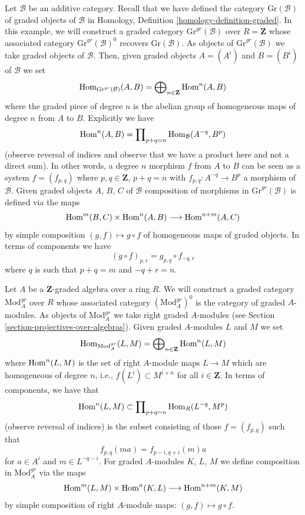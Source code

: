 \begin{example}
\label{example-graded-category-graded-objects}
Let $\mathcal{B}$ be an additive category. Recall that we have defined
the category $\text{Gr}(\mathcal{B})$ of graded objects of $\mathcal{B}$ in
Homology, Definition \ref{homology-definition-graded}.
In this example, we will construct a graded category
$\text{Gr}^{gr}(\mathcal{B})$ over $R = \mathbf{Z}$
whose associated category $\text{Gr}^{gr}(\mathcal{B})^0$
recovers $\text{Gr}(\mathcal{B})$.
As objects of $\text{Gr}^{gr}(\mathcal{B})$
we take graded objects of $\mathcal{B}$. Then, given graded objects
$A = (A^i)$ and $B = (B^i)$ of $\mathcal{B}$ we set
$$
\mathop{\mathrm{Hom}}\nolimits_{\text{Gr}^{gr}(\mathcal{B})}(A, B) =
\bigoplus\nolimits_{n \in \mathbf{Z}} \mathop{\mathrm{Hom}}\nolimits^n(A, B)
$$
where the graded piece of degree $n$ is the abelian group of homogeneous
maps of degree $n$ from $A$ to $B$. Explicitly we have
$$
\mathop{\mathrm{Hom}}\nolimits^n(A, B) = \prod\nolimits_{p + q = n} \mathop{\mathrm{Hom}}\nolimits_\mathcal{B}(A^{-q}, B^p)
$$
(observe reversal of indices and observe that we have a product here and
not a direct sum). In other words, a degree $n$ morphism $f$
from $A$ to $B$ can be seen as a system $f = (f_{p, q})$ where
$p, q \in \mathbf{Z}$, $p + q = n$ with
$f_{p, q} : A^{-q} \to B^p$ a morphism of $\mathcal{B}$.
Given graded objects $A$, $B$, $C$ of $\mathcal{B}$
composition of morphisms in $\text{Gr}^{gr}(\mathcal{B})$ is defined
via the maps
$$
\mathop{\mathrm{Hom}}\nolimits^m(B, C) \times \mathop{\mathrm{Hom}}\nolimits^n(A, B) \longrightarrow \mathop{\mathrm{Hom}}\nolimits^{n + m}(A, C)
$$
by simple composition $(g, f) \mapsto g \circ f$ of homogeneous
maps of graded objects. In terms of components we have
$$
(g \circ f)_{p, r} = g_{p, q} \circ f_{-q, r}
$$
where $q$ is such that $p + q = m$ and $-q + r = n$.
\end{example}

\begin{example}
\label{example-gm-gr-cat}
Let $A$ be a $\mathbf{Z}$-graded algebra over a ring $R$. We will construct
a graded category $\text{Mod}^{gr}_A$ over $R$ whose associated category
$(\text{Mod}^{gr}_A)^0$ is the category of graded $A$-modules. As objects
of $\text{Mod}^{gr}_A$ we take right graded $A$-modules (see
Section \ref{section-projectives-over-algebras}). Given graded
$A$-modules $L$ and $M$ we set
$$
\mathop{\mathrm{Hom}}\nolimits_{\text{Mod}^{gr}_A}(L, M) =
\bigoplus\nolimits_{n \in \mathbf{Z}} \mathop{\mathrm{Hom}}\nolimits^n(L, M)
$$
where $\mathop{\mathrm{Hom}}\nolimits^n(L, M)$ is the set of right $A$-module maps $L \to M$ which
are homogeneous of degree $n$, i.e., $f(L^i) \subset M^{i + n}$ for
all $i \in \mathbf{Z}$. In terms of components, we have that
$$
\mathop{\mathrm{Hom}}\nolimits^n(L, M) \subset \prod\nolimits_{p + q = n} \mathop{\mathrm{Hom}}\nolimits_R(L^{-q}, M^p)
$$
(observe reversal of indices) is the subset consisting of those
$f = (f_{p, q})$ such that
$$
f_{p, q}(m a) = f_{p - i, q + i}(m)a
$$
for $a \in A^i$ and $m \in L^{-q - i}$. For graded $A$-modules
$K$, $L$, $M$ we define composition in $\text{Mod}^{gr}_A$ via
the maps
$$
\mathop{\mathrm{Hom}}\nolimits^m(L, M) \times \mathop{\mathrm{Hom}}\nolimits^n(K, L) \longrightarrow \mathop{\mathrm{Hom}}\nolimits^{n + m}(K, M)
$$
by simple composition of right $A$-module maps: $(g, f) \mapsto g \circ f$.
\end{example}

